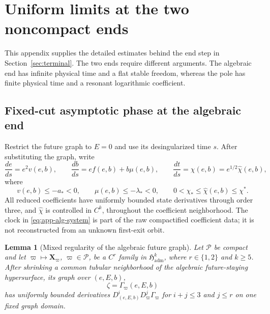 \documentclass[11pt]{amsart}
\numberwithin{equation}{section}
\newtheorem{lemma}[theorem]{Lemma}
\theoremstyle{definition}
\theoremstyle{remark}
\begin{document}
\section{Uniform limits at the two noncompact ends}
\label{app:end-limits}

This appendix supplies the detailed estimates behind the end step in
Section~\ref{sec:terminal}.  The two ends require different arguments.
The algebraic end has infinite physical time and a flat stable freedom,
whereas the pole has finite physical time and a resonant logarithmic
coefficient.

\subsection{Fixed-cut asymptotic phase at the algebraic end}

Restrict the future graph to $E=0$ and use its desingularized time $s$.
After substituting the graph, write
\begin{equation}\label{eq:app-alg-system}
 \frac{de}{ds}=e^2v(e,b),\qquad
 \frac{db}{ds}=e f(e,b)+b\mu(e,b),
 \qquad
 \frac{dt}{ds}=\chi(e,b)=e^{1/2}\widehat\chi(e,b),
\end{equation}
where
\begin{equation}\label{eq:app-alg-rates}
 v(e,b)\le-a_*<0,\qquad
 \mu(e,b)\le-\lambda_*<0,\qquad
 0<\chi_*\le\widehat\chi(e,b)\le\chi^*.
\end{equation}
All reduced coefficients have uniformly bounded state derivatives through
order three, and $\widehat\chi$ is controlled in $C^k$, throughout the
coefficient neighborhood.  The
clock in \eqref{eq:app-alg-system} is part of the raw compactified
coefficient data; it is not reconstructed from an unknown first-exit orbit.

\begin{lemma}[Mixed regularity of the algebraic future graph]
\label{lem:app-alg-graph-parameter}
Let $\mathcal P$ be compact and let
$\varpi\mapsto\mathbf X_\varpi$, $\varpi\in\mathcal P$, be a $C^r$ family in
$\mathfrak H_{\mathrm{adm}}^k$, where $r\in\{1,2\}$ and $k\ge5$.
After shrinking a common tubular neighborhood of the algebraic
future-staying hypersurface, its graph over $(e,E,b)$,
\[
 \zeta=\Gamma_\varpi(e,E,b)
\]
has uniformly bounded derivatives
$D_{(e,E,b)}^iD_\varpi^j\Gamma_\varpi$ for
$i+j\le3$ and $j\le r$ on one fixed graph domain.
\end{lemma}
\end{document}
